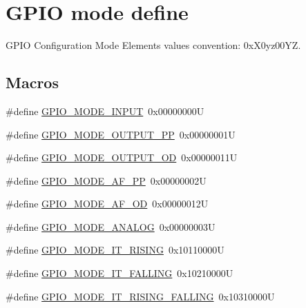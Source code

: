 \hypertarget{group___g_p_i_o__mode__define}{}\section{G\+P\+IO mode define}
\label{group___g_p_i_o__mode__define}


G\+P\+IO Configuration Mode Elements values convention\+: 0x\+X0yz00\+YZ.  


\subsection*{Macros}
\begin{DoxyCompactItemize}
\item 
\#define \mbox{\hyperlink{group___g_p_i_o__mode__define_gaf40bec3146810028a84b628d37d3b391}{G\+P\+I\+O\+\_\+\+M\+O\+D\+E\+\_\+\+I\+N\+P\+UT}}~0x00000000U
\item 
\#define \mbox{\hyperlink{group___g_p_i_o__mode__define_ga1013838a64cec2f8c88f079c449d1982}{G\+P\+I\+O\+\_\+\+M\+O\+D\+E\+\_\+\+O\+U\+T\+P\+U\+T\+\_\+\+PP}}~0x00000001U
\item 
\#define \mbox{\hyperlink{group___g_p_i_o__mode__define_ga2f91757829f6e9505ec386b840941929}{G\+P\+I\+O\+\_\+\+M\+O\+D\+E\+\_\+\+O\+U\+T\+P\+U\+T\+\_\+\+OD}}~0x00000011U
\item 
\#define \mbox{\hyperlink{group___g_p_i_o__mode__define_ga526c72c5264316fc05c775b6cad4aa6a}{G\+P\+I\+O\+\_\+\+M\+O\+D\+E\+\_\+\+A\+F\+\_\+\+PP}}~0x00000002U
\item 
\#define \mbox{\hyperlink{group___g_p_i_o__mode__define_ga282b9fd37c8ef31daba314ffae6bf023}{G\+P\+I\+O\+\_\+\+M\+O\+D\+E\+\_\+\+A\+F\+\_\+\+OD}}~0x00000012U
\item 
\#define \mbox{\hyperlink{group___g_p_i_o__mode__define_ga7a04f9ab65ad572ad20791a35009220c}{G\+P\+I\+O\+\_\+\+M\+O\+D\+E\+\_\+\+A\+N\+A\+L\+OG}}~0x00000003U
\item 
\#define \mbox{\hyperlink{group___g_p_i_o__mode__define_ga088659562e68426d9a72821ea4fd8d50}{G\+P\+I\+O\+\_\+\+M\+O\+D\+E\+\_\+\+I\+T\+\_\+\+R\+I\+S\+I\+NG}}~0x10110000U
\item 
\#define \mbox{\hyperlink{group___g_p_i_o__mode__define_gaa166210a6da3ac7e8d7504702520e522}{G\+P\+I\+O\+\_\+\+M\+O\+D\+E\+\_\+\+I\+T\+\_\+\+F\+A\+L\+L\+I\+NG}}~0x10210000U
\item 
\#define \mbox{\hyperlink{group___g_p_i_o__mode__define_ga0678e61090ed61e91a6496f22ddfb3d1}{G\+P\+I\+O\+\_\+\+M\+O\+D\+E\+\_\+\+I\+T\+\_\+\+R\+I\+S\+I\+N\+G\+\_\+\+F\+A\+L\+L\+I\+NG}}~0x10310000U

\end{DoxyCompactItemize}

